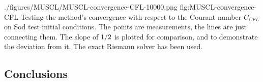 \quickfigcap
	{./figures/MUSCL/MUSCL-convergence-CFL-10000.png}
	{fig:MUSCL-convergence-CFL}
	{
		Testing the method's convergence with respect to the Courant number $C_{CFL}$ on Sod test initial conditions.
		The points are measurements, the lines are just connecting them.
		The slope of $1/2$ is plotted for comparison, and to demonstrate the deviation from it.
		The exact Riemann solver has been used.
	}























\subsection{Conclusions}


